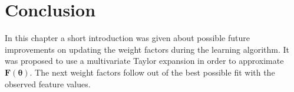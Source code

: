 \section{Conclusion}\label{s:conclusion_enh}
In this chapter a short introduction was given about possible future improvements on updating the weight factors during the learning algorithm. It was proposed to use a multivariate Taylor expansion in order to approximate $\bm{F}(\bm{\theta})$. The next weight factors follow out of the best possible fit with the observed feature values.
 
%		

